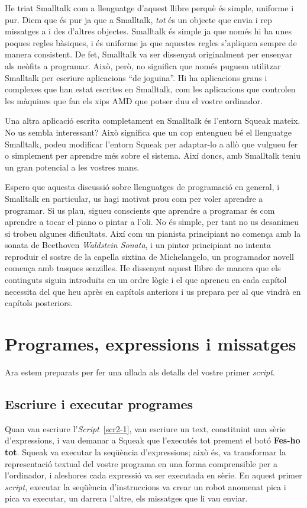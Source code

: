 He triat Smalltalk com a llenguatge d'aquest llibre perquè és simple, uniforme i pur. Diem que és pur ja que a Smalltalk, \emph{tot} és un objecte que envia i rep missatges a i des d'altres objectes. Smalltalk és simple ja que només hi ha unes poques regles bàsiques, i és uniforme ja que aquestes regles s'apliquen sempre de manera consistent. De fet, Smalltalk va ser dissenyat originalment per ensenyar als neòfits a programar. Això, però, no significa que només puguem utilitzar Smalltalk per escriure aplicacions ``de joguina''. Hi ha aplicacions grans i complexes que han estat escrites en Smalltalk, com les aplicacions que controlen les màquines que fan els xips AMD que potser duu el vostre ordinador.

Una altra aplicació escrita completament en Smalltalk és l'entorn Squeak mateix. No us sembla interessant? Això significa que un cop entengueu bé el llenguatge Smalltalk, podeu modificar l'entorn Squeak per adaptar-lo a allò que vulgueu fer o simplement per aprendre més sobre el sistema. Així doncs, amb Smalltalk teniu un gran potencial a les vostres mans.

Espero que aquesta discussió sobre llenguatges de programació en general, i Smalltalk en particular, us hagi motivat prou com per voler aprendre a programar. Si us plau, sigueu conscients que aprendre a programar és com aprendre a tocar el piano o pintar a l'oli. No és simple, per tant no us desanimeu si trobeu algunes dificultats. Així com un pianista principiant no comença amb la sonata de Beethoven \emph{Waldstein Sonata}, i un pintor principiant no intenta reproduir el sostre de la capella sixtina de Michelangelo, un programador novell comença amb tasques senzilles. He dissenyat aquest llibre de manera que els continguts siguin introduïts en un ordre lògic i el que apreneu en cada capítol necessita del que heu après en capítols anteriors i us prepara per al que vindrà en capítols posteriors.  

\section{Programes, expressions i missatges}
Ara estem preparats per fer una ullada als detalls del vostre primer \emph{script}.

\subsection{Escriure i executar programes}
Quan vau escriure l'\emph{Script}~\ref{scr2-1}, vau escriure un text, constituint una sèrie d'expressions, i vau demanar a Squeak que l'executés tot prement el botó \textbf{Fes-ho tot}. Squeak va executar la seqüència d'expressions; això és, va transformar la representació textual del vostre programa en una forma comprensible per a l'ordinador,  i aleshores cada expressió va ser executada en sèrie. En aquest primer \emph{script}, executar la seqüència d'instruccions va crear un robot anomenat \textsf{pica} i \textsf{pica} va executar, un darrera l'altre, els missatges que li vau enviar.

